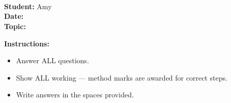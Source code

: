 
\pagestyle{empty}
\begin{center}
    \vspace*{2cm}
    {\Huge \textbf{\examBoard}} \\[5mm]
    {\LARGE \textbf{\examSubject}} \\[3mm]
    {\Large \examPaper} \\[8mm]
    \begin{tcolorbox}[colback=white, colframe=black, arc=4mm, width=0.7\textwidth,
                       boxrule=1.5pt, top=4mm, bottom=4mm]
        \centering
        {\large \textbf{Student:}} Amy \\[3mm]
        {\large \textbf{Date:}} \examDate \\[3mm]
        {\large \textbf{Topic:}} \examTier
    \end{tcolorbox}
    \vspace{5mm}
    {\large \textbf{Instructions:}}\\[2mm]
    \begin{itemize}[leftmargin=3cm]
        \item Answer ALL questions.
        \item Show ALL working — method marks are awarded for correct steps.
        \item Write answers in the spaces provided.
    \end{itemize}
\end{center}
\newpage
